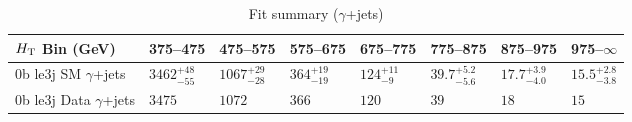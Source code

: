 \documentclass[8pt]{article}
\def\scalht{\mbox{$H_{\rm{T}}$}\xspace}
\newcommand\T{\rule{0pt}{2.6ex}}
\begin{document}
\begin{table}[ht!]
\caption{Fit summary ($\gamma$+jets)}
\label{tab:ensemble-summary}
\centering
\begin{tabular}{ llllllll }

\hline
\scalht Bin (GeV)       & 375--475                       & 475--575                       & 575--675                       & 675--775                       & 775--875                       & 875--975                       & 975--$\infty$                  \\ [1.000000ex]
\hline
0b le3j SM $\gamma$+jets\T & $3462^{+48}_{-55}$             & $1067^{+29}_{-28}$             & $364^{+19}_{-19}$              & $124^{+11}_{-9}$               & $39.7^{+5.2}_{-5.6}$           & $17.7^{+3.9}_{-4.0}$           & $15.5^{+2.8}_{-3.8}$           \\ 
0b le3j Data $\gamma$+jets\T & $3475$                         & $1072$                         & $366$                          & $120$                          & $39$                           & $18$                           & $15$                           \\ 
\hline

\end{tabular}
\end{table}
\end{document}
